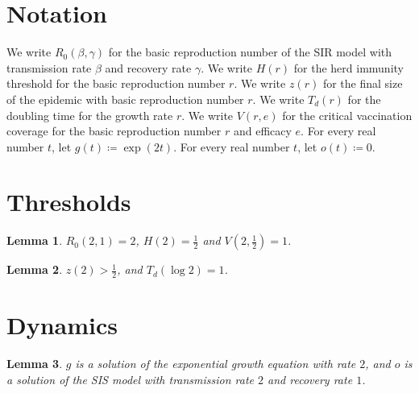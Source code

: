 \documentclass{article}
\newtheorem{lemma}{Lemma}
\begin{document}
\section{Notation}

We write $R_0(\beta,\gamma)$ for the basic reproduction number of the SIR model with transmission rate $\beta$ and recovery rate $\gamma$.
We write $H(r)$ for the herd immunity threshold for the basic reproduction number $r$.
We write $z(r)$ for the final size of the epidemic with basic reproduction number $r$.
We write $T_d(r)$ for the doubling time for the growth rate $r$.
We write $V(r,e)$ for the critical vaccination coverage for the basic reproduction number $r$ and efficacy $e$.
For every real number $t$, let $g(t)\coloneqq\exp(2t)$.
For every real number $t$, let $o(t)\coloneqq0$.

\section{Thresholds}

\begin{lemma}\label{thresholds}
$R_0(2,1)=2$, $H(2)=\frac12$ and $V(2,\frac12)=1$.
\end{lemma}

\begin{lemma}\label{finalsize}
$z(2)>\frac12$, and $T_d(\log 2)=1$.
\end{lemma}

\section{Dynamics}

\begin{lemma}\label{growth}
$g$ is a solution of the exponential growth equation with rate $2$, and $o$ is a solution of the SIS model with transmission rate $2$ and recovery rate $1$.
\end{lemma}
\end{document}
